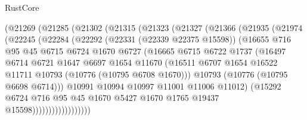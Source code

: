 \begin{lexlean}{RustCore}
\begin{coremodule}
            (@21269
              (@21285
                (@21302
                  (@21315
                    (@21323
                      (@21327
                        (@21366
                          (@21935
                            (@21974
                              (@22245
                                (@22284
                                  (@22292
                                    (@22331 (@22339 @22375 @15598))
                                    (@16655
                                      @716
                                      @95
                                      @45
                                      @6715
                                      @6724
                                      @1670
                                      @6727
                                      (@16665
                                        @6715
                                        @6722
                                        @1737
                                        (@16497
                                          @6714
                                          @6721
                                          @1647
                                          @6697
                                          @1654
                                          @11670
                                          (@16511
                                            @6707
                                            @1654
                                            @16522
                                            @11711
                                            @10793
                                            (@10776 (@10795 @6708 @1670)))
                                          @10793
                                          (@10776 (@10795 @6698 @6714)))
                                        @10991
                                        @10994
                                        @10997
                                        @11001
                                        @11006
                                        @11012)
                                      (@15292
                                        @6724
                                        @716
                                        @95
                                        @45
                                        @1670
                                        @5427
                                        @1670
                                        @1765
                                        @19437
                                        @15598))))))))))))))))))

\end{coremodule}
\end{lexlean}
